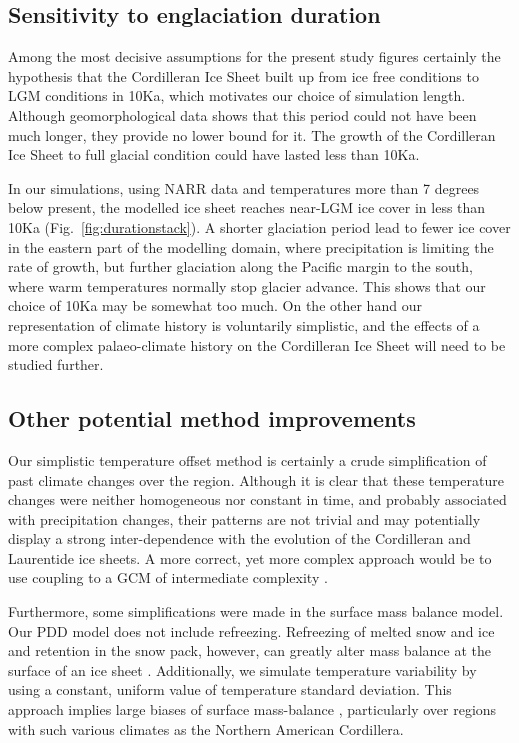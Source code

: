 \subsection{Sensitivity to englaciation duration}

Among the most decisive assumptions for the present study figures certainly the hypothesis that the Cordilleran Ice Sheet built up from ice free conditions to LGM conditions in 10Ka, which motivates our choice of simulation length. Although geomorphological data shows that this period could not have been much longer, they provide no lower bound for it. The growth of the Cordilleran Ice Sheet to full glacial condition could have lasted less than 10Ka.

In our simulations, using NARR data and temperatures more than 7 degrees below present, the modelled ice sheet reaches near-LGM ice cover in less than 10Ka (Fig.~\ref{fig:durationstack}). A shorter glaciation period lead to fewer ice cover in the eastern part of the modelling domain, where precipitation is limiting the rate of growth, but further glaciation along the Pacific margin to the south, where warm temperatures normally stop glacier advance. This shows that our choice of 10Ka may be somewhat too much. On the other hand our representation of climate history is voluntarily simplistic, and the effects of a more complex palaeo-climate history on the Cordilleran Ice Sheet will need to be studied further.

\subsection{Other potential method improvements}

Our simplistic temperature offset method is certainly a crude simplification of past climate changes over the region. Although it is clear that these temperature changes were neither homogeneous nor constant in time, and probably associated with precipitation changes, their patterns are not trivial and may potentially display a strong inter-dependence with the evolution of the Cordilleran and Laurentide ice sheets. A more correct, yet more complex approach would be to use coupling to a GCM of intermediate complexity \citep{yoshimori-etal-2001,calov-etal-2002,abeouchi-etal-2007,charbit-etal-2013}.

Furthermore, some simplifications were made in the surface mass balance model. Our PDD model does not include refreezing. Refreezing of melted snow and ice and retention in the snow pack, however, can greatly alter mass balance at the surface of an ice sheet \citep{janssens-huybrechts-2000}. Additionally, we simulate temperature variability by using a constant, uniform value of temperature standard deviation. This approach implies large biases of surface mass-balance \citep{charbit-etal-2013,rau-rogozhina-2013,seguinot-inpress}, particularly over regions with such various climates as the Northern American Cordillera.

